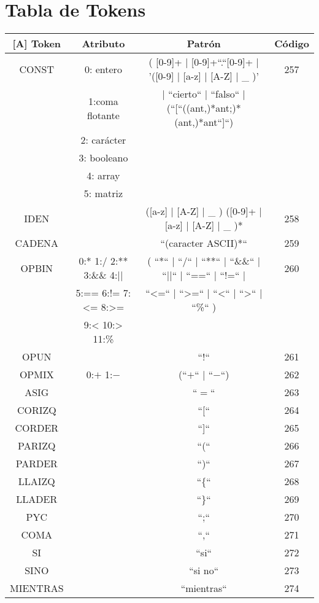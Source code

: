 \newpage
\section{Tabla de Tokens}

\begin{table}
\centering
\begin{tabular}{| c | c | c | c |}[A]
  \hline
  Token & Atributo & Patrón & Código \\ \hline
  CONST & 0: entero & ( [0-9]+ | [0-9]+``.``[0-9]+ | '([0-9] | [a-z] | [A-Z] | \_ )'  & 257 \\
  & 1:coma flotante & | ``cierto`` | ``falso`` | (``[``((ant,)*ant;)*(ant,)*ant``]``) &  \\
  & 2: carácter & & \\
  & 3: booleano & & \\
  & 4: array & & \\
  & 5: matriz & & \\ \hline
  IDEN & & ([a-z] | [A-Z] | \_ ) ([0-9]+ | [a-z] | [A-Z] | \_ )* & 258 \\ \hline
  CADENA & & ``(caracter ASCII)*`` & 259 \\ \hline
  OPBIN & 0:*  1:/  2:**  3:\&\& 4:|| & ( ``*``  |  ``/``  |  ``**``  |  ``\&\&``  |  ``||`` |  ``==`` |  ``$!$=``  |   & 260 \\
  &   5:== 6:!= 7:\textless{}= 8:>=   & ``\textless{}=``  |  ``\textgreater=``  |  ``\textless`` |  ``\textgreater``  |  ``\%``  )& \\
  & 9:< 10:> 11:\% & & \\ \hline
OPUN & & ``$!$`` &  261 \\ \hline
OPMIX & 0:$+$ 1:$-$ & (``$+$`` | ``$-$``) & 262 \\ \hline
ASIG &  & ``$=$`` & 263 \\ \hline
CORIZQ & & ``[`` & 264 \\ \hline
CORDER & & ``]`` & 265\\ \hline
PARIZQ & & ``(`` & 266\\ \hline
PARDER & & ``)`` & 267\\ \hline
LLAIZQ & & ``\{`` & 268\\ \hline
LLADER & & ``\}`` & 269\\ \hline
PYC & & ``;`` & 270\\ \hline
COMA & & ``,`` & 271\\ \hline
SI & & ``si`` & 272\\ \hline
SINO & & ``si no`` & 273\\ \hline
MIENTRAS & & ``mientras`` & 274\\ \hline

\end{tabular}
\end{table}
